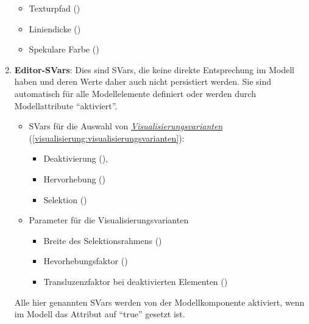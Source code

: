 \documentclass[a4paper,10pt]{sphinxmanual}
\begin{document}
\begin{enumerate}
\begin{itemize}
\item {} 
Texturpfad ()

\item {} 
Liniendicke ()

\item {} 
Spekulare Farbe ()

\end{itemize}

\item {} 
\textbf{Editor-SVars}:
Dies sind SVars, die keine direkte Entsprechung im Modell haben und deren Werte daher auch nicht persistiert werden.
Sie sind automatisch für alle Modellelemente definiert oder werden durch Modellattribute "`aktiviert"'.
\begin{itemize}
\item {} 
SVars für die Auswahl von {\hyperref[visualisierung:visualisierungsvarianten]{\emph{Visualisierungsvarianten}}} (\autoref*{visualisierung:visualisierungsvarianten}):
\begin{itemize}
\item {} 
Deaktivierung (),

\item {} 
Hervorhebung ()

\item {} 
Selektion ()

\end{itemize}

\item {} 
Parameter für die Visualisierungsvarianten
\begin{itemize}
\item {} 
Breite des Selektionsrahmens ()

\item {} 
Hevorhebungsfaktor ()

\item {} 
Transluzenzfaktor bei deaktivierten Elementen ()

\end{itemize}

\end{itemize}

Alle hier genannten SVars werden von der Modellkomponente aktiviert, wenn im Modell das Attribut  auf "`true"' gesetzt ist.

\end{enumerate}
\end{document}
